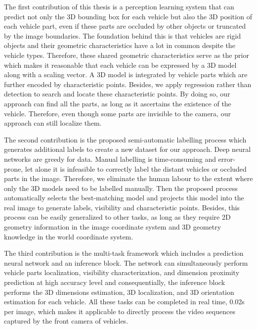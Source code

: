 \documentclass[a4paper,12pt]{article}
\begin{document}
The first contribution of this thesis is a perception learning system that can predict not only the 3D bounding box for each vehicle but also the 3D position of each vehicle part, even if these parts are occluded by other objects or truncated by the image boundaries. The foundation behind this is that vehicles are rigid objects and their geometric characteristics have a lot in common despite the vehicle types. Therefore, these shared geometric characteristics serve as the prior which makes it reasonable that each vehicle can be expressed by a 3D model along with a scaling vector. A 3D model is integrated by vehicle parts which are further encoded by characteristic points. Besides, we apply regression rather than detection to search and locate these characteristic points. By doing so, our approach can find all the parts, as long as it ascertains the existence of the vehicle. Therefore, even though some parts are invisible to the camera, our approach can still localize them. 

The second contribution is the proposed semi-automatic labelling process which generates additional labels to create a new dataset for our approach.  Deep neural networks are greedy for data. Manual labelling is time-consuming and error-prone, let alone it is infeasible to correctly label the distant vehicles or occluded parts in the image. Therefore, we eliminate the human labour to the extent where only the 3D models need to be labelled manually. Then the proposed process automatically selects the best-matching model and projects this model into the real image to generate labels, \eg visibility and characteristic points.  Besides, this process can be easily generalized to other tasks, as long as they require 2D geometry information in the image coordinate system and 3D geometry knowledge in the world coordinate system.

The third contribution is the multi-task framework which includes a prediction neural network and an inference block. The network can simultaneously perform vehicle parts localization, visibility characterization, and dimension proximity prediction at high accuracy level and consequentially, the inference block performs the 3D dimensions estimation,  3D  localization, and 3D orientation estimation for each vehicle. All these tasks can be completed in real time, 0.02s per image, which makes it applicable to directly process the video sequences captured by the front camera of vehicles.

\clearpage
\end{document}

